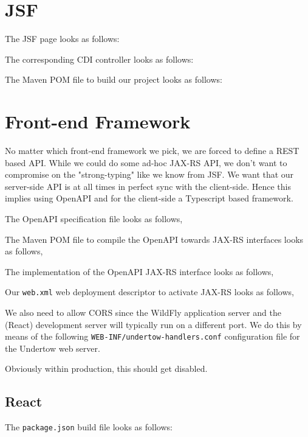 \section{JSF}
The JSF page looks as follows:

The corresponding CDI controller looks as follows:

The Maven POM file to build our project looks as follows:


\section{Front-end Framework}
No matter which front-end framework we pick, we are forced to define a REST based API.
While we could do some ad-hoc JAX-RS API, we don't want to compromise on the "strong-typing" like we know from JSF.
We want that our server-side API is at all times in perfect sync with the client-side.
Hence this implies using OpenAPI and for the client-side a Typescript based framework.

The OpenAPI specification file looks as follows,


The Maven POM file to compile the OpenAPI towards JAX-RS interfaces looks as follows,


The implementation of the OpenAPI JAX-RS interface looks as follows,


Our \texttt{web.xml} web deployment descriptor to activate JAX-RS looks as follows,


We also need to allow CORS since the WildFly application server and the (React) development server will typically run on a different port.
We do this by means of the following \texttt{WEB-INF/undertow-handlers.conf} configuration file for the Undertow web server.

Obviously within production, this should get disabled.

\subsection{React}
The \texttt{package.json} build file looks as follows:


